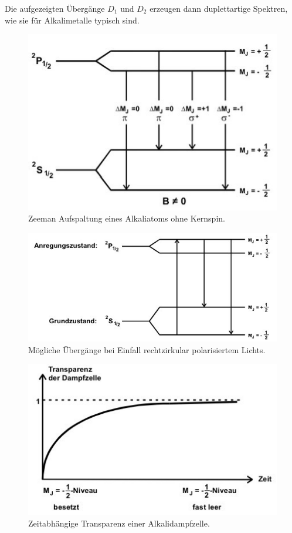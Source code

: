 Die aufgezeigten Übergänge $D_1$ und $D_2$ erzeugen dann duplettartige Spektren, wie sie für Alkalimetalle typisch sind.

\begin{figure}[H]
	\centering
	\includegraphics[width=0.55\linewidth]{content/grafik/zeeman.jpg}
	\caption{Zeeman Aufspaltung eines Alkaliatoms ohne Kernspin. \cite{pumpen}}
	\label{fig:zeeman}
\end{figure}



\begin{figure}[H]
	\centering
	\includegraphics[width=0.65\linewidth]{content/grafik/pumpen.jpg}
	\caption{Mögliche Übergänge bei Einfall rechtzirkular polarisiertem Lichts. \cite{pumpen}}
	\label{fig:pumpen}
\end{figure}

\begin{figure}[H]
	\centering
	\includegraphics[width=0.6\linewidth]{content/grafik/transparenz.jpg}
	\caption{Zeitabhängige Transparenz einer Alkalidampfzelle. \cite{pumpen}}
	\label{fig:transparenz}
\end{figure}

